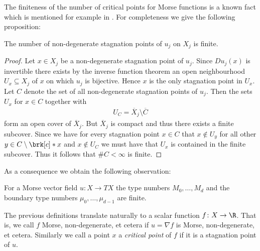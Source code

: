 The finiteness of the number of critical points for Morse functions is a known fact which is mentioned
for example in \cite{Morse1970}. For completeness we give the following proposition:
\begin{proposition}\label{pr:finiteness_critical_points}
  The number of non-degenerate
  stagnation points of $u_j$ on $X_j$ is finite.
\end{proposition}
\begin{proof}
  Let $x\in X_j$ be a non-degenerate stagnation point of $u_j$. Since $Du_j(x)$ is invertible there exists
  by the inverse function theorem an open neighbourhood $U_x\subseteq X_j$ of $x$ on which 
  $u_j$ is bijective. Hence $x$ is the only stagnation point in $U_x$. Let $C$ denote the set of all
  non-degenerate stagnation points of $u_j$. Then the sets $U_x$ for $x\in C$ together with
  \begin{align}
    U_C=\overline{X}_j\setminus \overline{C}
  \end{align}
  form an open cover of $\overline{X}_j$. But $\overline{X}_j$ is compact and thus there exists
  a finite subcover. Since we have for every stagnation point $x\in C$ that
  $x\not\in U_y$ for all other $y\in C\setminus\brk[c]*{x}$ and $x\not\in U_C$ we must have that $U_x$
  is contained in the finite subcover. Thus it follows that $\#C<\infty$ is finite.
\end{proof}
As a consequence we obtain the following observation:
\begin{corollary}\label{co:finiteness_type_nbrs}
  For a Morse vector field $u\colon X\to TX$ the type numbers $M_0,\dots,M_d$ and the boundary type numbers $\mu_0,\dots,\mu_{d-1}$
  are finite.
\end{corollary}

The previous definitions translate naturally to a scalar function $f\colon X\to\R$.
That is, we call $f$ Morse, non-degenerate, et cetera if $u=\nabla f$ is Morse, non-degenerate, et cetera.
Similarly we call a point $x$ a \emph{critical point} of $f$ if it is a
stagnation point of $u$.


